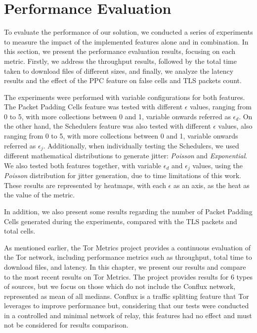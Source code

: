 \section{Performance Evaluation}\label{sec:performance_evaluation}

To evaluate the performance of our solution, we conducted a series of experiments to measure the impact of the implemented features alone and in combination. In this section, we present the performance evaluation results, focusing on each metric. Firstly, we address the throughput results, followed by the total time taken to download files of different sizes, and finally, we analyze the latency results and the effect of the PPC feature on false cells and TLS packets count. 

The experiments were performed with variable configurations for both features. The Packet Padding Cells feature was tested with different $\epsilon$ values, ranging from 0 to 5, with more collections between 0 and 1, variable onwards referred as $\epsilon_d$. On the other hand, the Schedulers feature was also tested with different $\epsilon$ values, also ranging from 0 to 5, with more collections between 0 and 1, variable onwards referred as $\epsilon_j$. Additionally, when individually testing the Schedulers, we used different mathematical distributions to generate jitter: \textit{Poisson} and \textit{Exponential}. We also tested both features together, with variable $\epsilon_d$ and $\epsilon_j$ values, using the \textit{Poisson} distribution for jitter generation, due to time limitations of this work. These results are represented by heatmaps, with each $\epsilon$ as an axis, as the heat as the value of the metric.

In addition, we also present some results regarding the number of Packet Padding Cells generated during the experiments, compared with the TLS packets and total cells.

As mentioned earlier, the Tor Metrics project provides a continuous evaluation of the Tor network, including performance metrics such as throughput, total time to download files, and latency. In this chapter, we present our results and compare to the most recent results on Tor Metrics. The project provides results for 6 types of sources, but we focus on those which do not include the Conflux network, represented as mean of all medians. Conflux is a traffic splitting feature that Tor leverages to improve performance but, considering that our tests were conducted in a controlled and minimal network of relay, this features had no effect and must not be considered for results comparison. 


